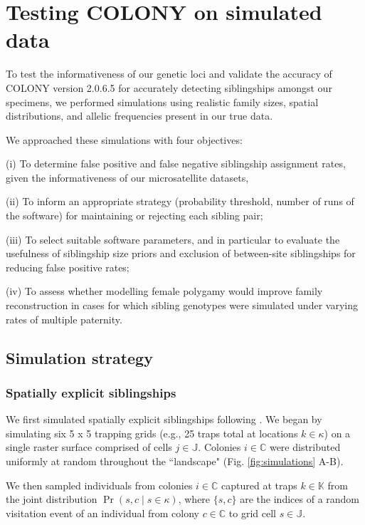 \documentclass[12pt]{article}
\begin{document}
\section{Testing COLONY on simulated data}
To test the informativeness of our genetic loci and validate the accuracy of COLONY version 2.0.6.5 \parencite{jonesCOLONYProgramParentage2010} for accurately detecting siblingships amongst our specimens, we performed simulations using realistic family sizes, spatial distributions, and allelic frequencies present in our true data.

We approached these simulations with four objectives:

(i) To determine false positive and false negative siblingship assignment rates, given the informativeness of our microsatellite datasets, 

(ii) To inform an appropriate strategy (probability threshold, number of runs of the software) for maintaining or rejecting each sibling pair;

(iii) To select suitable software parameters, and in particular to evaluate the usefulness of siblingship size priors and exclusion of between-site siblingships for reducing false positive rates;

(iv) To assess whether modelling female polygamy would improve family reconstruction in cases for which sibling genotypes were simulated under varying rates of multiple paternity.

\subsection{Simulation strategy}

\subsubsection{Spatially explicit siblingships}
We first simulated spatially explicit siblingships following \textcite{popeInferringForagingRanges2017}. We began by simulating six 5 x 5 trapping grids (e.g., 25 traps total at locations $k \in \kappa$) on a single raster surface comprised of cells $j \in \mathbb{J}$. Colonies $i \in \mathbb{C}$ were distributed uniformly at random throughout the ``landscape" (Fig. \ref{fig:simulations} A-B).

We then sampled individuals from colonies $i \in \mathbb{C}$ captured at traps $k \in \mathbb{K}$ from the joint distribution $\Pr(s, c \mid s \in \kappa)$, where $\{s,c\}$ are the indices of a random visitation event of an individual from colony $c \in \mathbb{C}$ to grid cell $s \in \mathbb{J}$.
\end{document}
